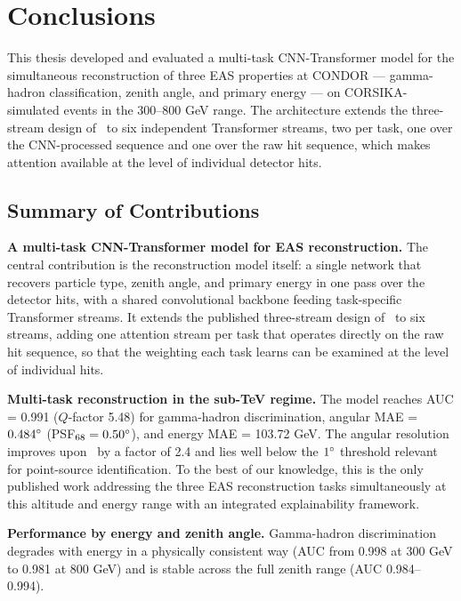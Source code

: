 \chapter{Conclusions}
\label{ch:conclusions}

This thesis developed and evaluated a multi-task CNN-Transformer model for the simultaneous reconstruction of three EAS properties at CONDOR --- gamma-hadron classification, zenith angle, and primary energy --- on CORSIKA-simulated events in the 300--800 GeV range. The architecture extends the three-stream design of~ to six independent Transformer streams, two per task, one over the CNN-processed sequence and one over the raw hit sequence, which makes attention available at the level of individual detector hits.

\section{Summary of Contributions}
\label{sec:contributions}

\textbf{A multi-task CNN-Transformer model for EAS reconstruction.} The central contribution is the reconstruction model itself: a single network that recovers particle type, zenith angle, and primary energy in one pass over the detector hits, with a shared convolutional backbone feeding task-specific Transformer streams. It extends the published three-stream design of~ to six streams, adding one attention stream per task that operates directly on the raw hit sequence, so that the weighting each task learns can be examined at the level of individual hits.

\textbf{Multi-task reconstruction in the sub-TeV regime.} The model reaches AUC = 0.991 ($Q$-factor 5.48) for gamma-hadron discrimination, angular MAE = $0.484\degree$ (PSF$_{68} = 0.50\degree$), and energy MAE = 103.72 GeV. The angular resolution improves upon~ by a factor of 2.4 and lies well below the $1\degree$ threshold relevant for point-source identification. To the best of our knowledge, this is the only published work addressing the three EAS reconstruction tasks simultaneously at this altitude and energy range with an integrated explainability framework.

\textbf{Performance by energy and zenith angle.} Gamma-hadron discrimination degrades with energy in a physically consistent way (AUC from 0.998 at 300 GeV to 0.981 at 800 GeV) and is stable across the full zenith range (AUC 0.984--0.994).

